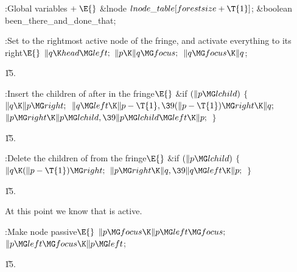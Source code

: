 \B{}:Global variables\X${}\mathrel+\E{}$\6
\&{lnode} ${}\\{lnode\_table}[\\{forestsize}+\T{1}]{}$;\6
\&{boolean} \\{been\_there\_and\_done\_that};\par
\fi

\B{}:Set  to the rightmost active node of the fringe, and
activate everything to its right\X${}\E{}$\6
$\|q\K\\{head}\MG\\{left};{}$\6
${}\|p\K\|q\MG\\{focus};{}$\6
${}\|q\MG\\{focus}\K\|q{}$;\par
\U15.\fi

\B{}:Insert the children of  after  in the fringe\X${}%
\E{}$\6
\&{if} ${}(\|p\MG\\{lchild}){}$\5
${}\{{}$\1\6
${}\|q\K\|p\MG\\{right};{}$\6
${}\|q\MG\\{left}\K\|p-\T{1},\39(\|p-\T{1})\MG\\{right}\K\|q;{}$\6
${}\|p\MG\\{right}\K\|p\MG\\{lchild},\39\|p\MG\\{lchild}\MG\\{left}\K\|p;{}$\6
\4${}\}{}$\2\par
\U15.\fi

\B{}:Delete the children of  from the fringe\X${}\E{}$\6
\&{if} ${}(\|p\MG\\{lchild}){}$\5
${}\{{}$\1\6
${}\|q\K(\|p-\T{1})\MG\\{right};{}$\6
${}\|p\MG\\{right}\K\|q,\39\|q\MG\\{left}\K\|p;{}$\6
\4${}\}{}$\2\par
\U15.\fi

At this point we know that  is active.

\Y\B\4:Make node  passive\X${}\E{}$\6
$\|p\MG\\{focus}\K\|p\MG\\{left}\MG\\{focus};{}$\6
${}\|p\MG\\{left}\MG\\{focus}\K\|p\MG\\{left}{}$;\par
\U15.\fi

